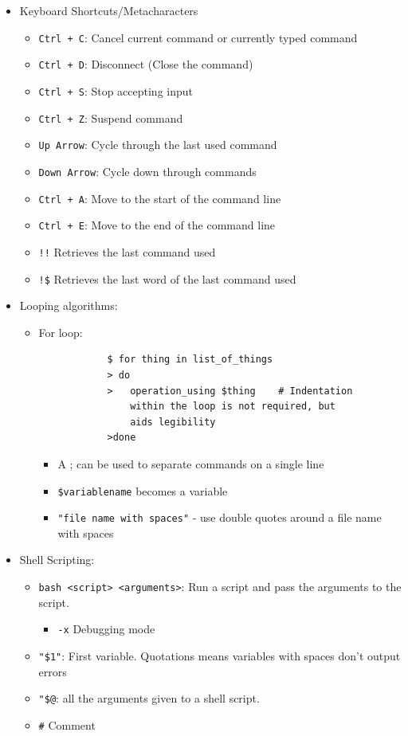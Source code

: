 \documentclass{article}
\begin{document}
\begin{itemize}
\begin{itemize}
    \end{itemize}
    \item Keyboard Shortcuts/Metacharacters
    \begin{itemize}
        \item \verb|Ctrl + C|: Cancel current command or currently typed command
        \item \verb|Ctrl + D|: Disconnect (Close the command)
        \item \verb|Ctrl + S|: Stop accepting input
        \item \verb|Ctrl + Z|: Suspend command
        \item \verb|Up Arrow|: Cycle through the last used command
        \item \verb|Down Arrow|: Cycle down through commands
        \item \verb|Ctrl + A|: Move to the start of the command line
        \item \verb|Ctrl + E|: Move to the end of the command line
        \item \verb|!!| Retrieves the last command used
        \item \verb|!$| Retrieves the last word of the last command used
    \end{itemize}
    \item Looping algorithms:
    \begin{itemize}
        \item For loop:
        \begin{verbatim}
            $ for thing in list_of_things
            > do
            >   operation_using $thing    # Indentation 
                within the loop is not required, but 
                aids legibility
            >done
        \end{verbatim}
        \begin{itemize}
            \item A ; can be used to separate commands on a single line
            \item \verb|$variablename| becomes a variable
            \item \verb|"file name with spaces"| - use double quotes around a file name with spaces
        \end{itemize}
    \end{itemize}
    \item Shell Scripting:
    \begin{itemize}
        \item \verb|bash <script> <arguments>|: Run a script and pass the arguments to the script.
        \begin{itemize}
            \item \verb|-x| Debugging mode
        \end{itemize}
        \item \verb|"$1"|: First variable. Quotations means variables with spaces don't output errors
        \item \verb|"$@|: all the arguments given to a shell script.
        \item \verb|#| Comment
    \end{itemize}
\end{itemize}
\end{document}
